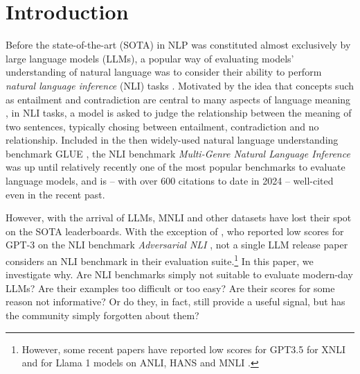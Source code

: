 \section{Introduction}

Before the state-of-the-art (SOTA) in NLP was constituted almost exclusively by large language models (LLMs), a popular way of evaluating models' understanding of natural language was to consider their ability to perform \emph{natural language inference} (NLI) tasks \citep[most famously,][]{bowman-etal-2015-large,williams-etal-2018-broad}.
Motivated by the idea that concepts such as entailment and contradiction are central to many aspects of language meaning \citep{bowman-etal-2015-large}, in NLI tasks, a model is asked to judge the relationship between the meaning of two sentences, typically chosing between entailment, contradiction and no relationship.
Included in the then widely-used natural language understanding benchmark GLUE \citep{wang2019glue}, the NLI benchmark \emph{Multi-Genre Natural Language Inference}  \citep[MNLI,][]{williams-etal-2018-broad} was up until relatively recently one of the most popular benchmarks to evaluate language models, and is -- with over 600 citations to date in 2024 -- well-cited even in the recent past.

However, with the arrival of LLMs, MNLI and other datasets have lost their spot on the SOTA leaderboards.
With the exception of \citet{brown2020language},  who reported low scores for GPT-3 on the NLI benchmark \emph{Adversarial NLI} \citep[ANLI,][]{nie-etal-2020-adversarial}, not a single LLM release paper considers an NLI benchmark in their evaluation suite.\footnote{However, some recent papers have reported low scores for GPT3.5 for XNLI \citep{ohmer2024form,ohmer-etal-2023-separating} and for Llama 1 models on ANLI, HANS \citep{mccoy-etal-2019-right} and MNLI \citep{weber-etal-2023-mind}.}
In this paper, we investigate why.
Are NLI benchmarks simply not suitable to evaluate modern-day LLMs? 
Are their examples too difficult or too easy?
Are their scores for some reason not informative?
Or do they, in fact, still provide a useful signal, but has the community simply forgotten about them?

